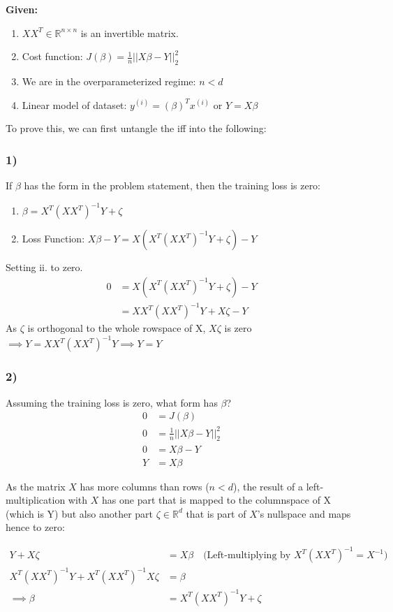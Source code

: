 \begin{answer} 

\textbf{Given:}
\begin{enumerate}
\item[i.] $XX^T \in \mathbb{R}^{n \times n}$ is an invertible matrix.
\item[ii.] Cost function: $J(\beta) = \frac{1}{n} ||X\beta - Y||^2_2$
\item[iii.] We are in the overparameterized regime: $n < d$
\item[iv.] Linear model of dataset: $y^{(i)} = (\beta)^T x^{(i)}$ or $Y = X\beta$
\end{enumerate}

To prove this, we can first untangle the iff into the following: \

\subsubsection*{1)}
If $\beta$ has the form in the problem statement, then the training loss is zero:

\begin{enumerate}
\item $\beta = X^T(XX^T)^{-1}Y + \zeta$
\item Loss Function: $X\beta - Y = X(X^T(XX^T)^{-1}Y + \zeta) - Y$ \\
\end{enumerate}

Setting ii. to zero.
\begin{align*}
0 &= X(X^T(XX^T)^{-1}Y + \zeta) - Y \\
&= XX^T(XX^T)^{-1}Y + X\zeta - Y
\end{align*}
As $\zeta$ is orthogonal to the whole rowspace of X, $X\zeta$ is zero \\
$\implies Y = XX^T(XX^T)^{-1}Y \implies Y=Y$

\subsubsection*{2)}
Assuming the training loss is zero, what form has $\beta$?
\begin{align*}
    0 &= J(\beta) \\
    0 &= \frac{1}{n} ||X\beta - Y||^2_2 \\
    0 &= X\beta - Y \\
    Y &= X\beta 
\end{align*}

As the matrix $X$ has more columns than rows ($n<d$), the result of a left-multiplication with $X$ has one part that is mapped to the columnspace of X (which is Y) but also another part $\zeta \in \mathbb{R}^d$ that is part of $X$'s nullspace and maps hence to zero:

\begin{align*}
    Y + X\zeta &= X\beta \quad \text{(Left-multiplying by } X^T(XX^T)^{-1} = X^{-1}) \\
    X^T(XX^T)^{-1}Y + X^T(XX^T)^{-1}X\zeta &= \beta \\
    \implies \beta &= X^T(XX^T)^{-1}Y + \zeta
\end{align*}    


\end{answer}
